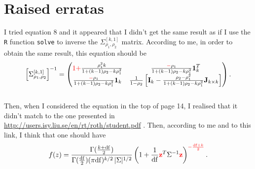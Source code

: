 \documentclass[11pt,letterpaper]{article}
\begin{document}
	\section{Raised erratas}
		I tried equation 8 and it appeared that I didn't get the same result as if I use the \texttt{R} function \texttt{solve} to inverse the $\Sigma_{\rho_1,\rho_2}^{\left[k,1\right]}$ matrix. According to me, in order to obtain the same result, this equation should be
		\begin{equation*}
			\left[\Sigma_{\rho_1,\rho_2}^{\left[k,1\right]} \right]^{-1} = 
			\left( \begin{matrix}
				\textcolor{red}{1 +} \frac{\rho_1^2 k}{1+(k-1)\rho_2 - k \rho_1^2} & \frac{\textcolor{red}{-}\rho_1}{1+(k-1)\rho_2 - k \rho_1^2} \textbf{1}_{k}^{T} \\
				\frac{\textcolor{red}{-}\rho_1}{1+(k-1)\rho_2 - k \rho_1^2} \textbf{1}_{k} & \frac{1}{1-\rho_2} \left[\textbf{I}_k - \frac{\rho_2 - \rho_1^2}{1+(k-1)\rho_2 - k \rho_1^2} \textbf{J}_{k \times k} \right]
			\end{matrix} \right).
		\end{equation*}
		\\
		Then, when I considered the equation in the top of page 14, I realised that it didn't match to the one presented in \url{http://users.isy.liu.se/en/rt/roth/student.pdf}%
		. Then, according to me and to this link, I think that one should have
		\begin{equation*}
			f(z) = \frac{\Gamma(\frac{k+\mathrm{df}}{2})}{\Gamma(\frac{\mathrm{df}}{2}) (\pi \mathrm{df})^{k/2}\, |\Sigma|^{1/2} }
			\left(1 + \frac{1}{\mathrm{df}}\textcolor{red}{\textbf{z}}^T \Sigma^{-1}\textcolor{red}{\textbf{z}}\right)^{\textcolor{red}{-\frac{\mathrm{df}+k}{2}}}.
		\end{equation*}
	
\end{document}
